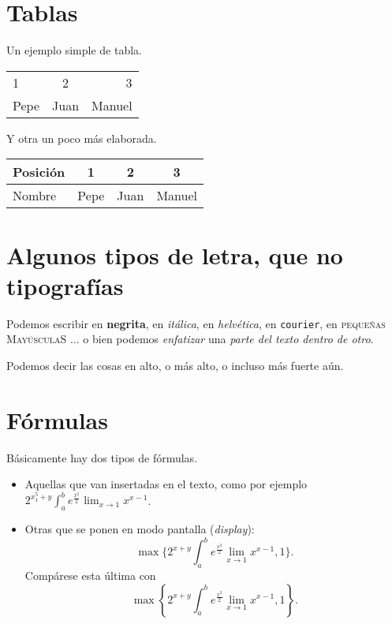 \documentclass[11pt]{amsart}
\begin{document}
\section{Tablas} 

Un ejemplo simple de tabla.

\begin{tabular}{lcr}
1 & 2 & 3 \\
Pepe & Juan & Manuel
\end{tabular}

Y otra un poco más elaborada.

\begin{tabular}{l||c|c|c|} \hline
Posición & 1 & 2 & 3 \\ \hline \hline
Nombre & Pepe & Juan & Manuel\\ \hline
\end{tabular}


\section{Algunos tipos de letra, que no tipografías}

Podemos escribir en  \textbf{negrita}, en \textit{itálica}, en \textsl{helvética}, en \texttt{courier}, en \textsc{pequeñas MayúsculaS} ... o bien podemos \emph{enfatizar} una \textit{parte del texto \emph{dentro} de otro}.

Podemos decir las cosas en {\large alto}, o más {\Large alto}, o incluso {\huge más} fuerte {\Huge aún}.


\section{Fórmulas}

Básicamente hay dos tipos de fórmulas.
\begin{itemize}
\item Aquellas que van insertadas en el texto, como por ejemplo $2^{x_1^5+y}\int_a^b e^{\frac{x^2}{2}}\lim_{x\to 1}x^{x-1}$.
\item Otras que se ponen en modo pantalla (\emph{display}): \[\max\{2^{x+y}\int_a^b e^{\frac{x^2}{2}}\lim_{x\to 1}x^{x-1},1\}.\]
Compárese esta última con 
\[\max\left\{2^{x+y}\int_a^b e^{\frac{x^2}{2}}\lim_{x\to 1}x^{x-1},1\right\}.\]
\end{itemize}
\end{document}
